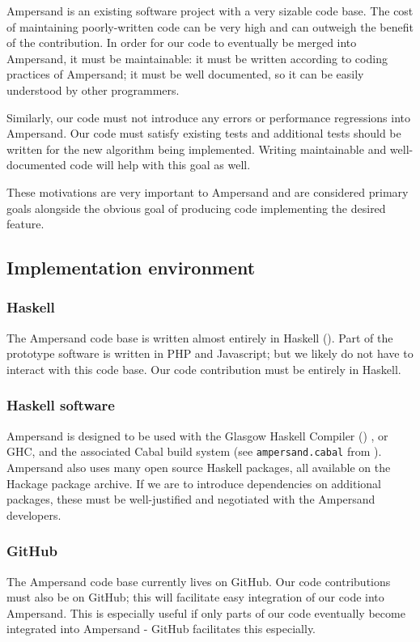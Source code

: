 \documentclass[12pt]{report}
\begin{document}
Ampersand is an existing software project with a very sizable code base. The
cost of maintaining poorly-written code can be very high and can outweigh the
benefit of the contribution. In order for our code to eventually be merged into
Ampersand, it must be maintainable: it must be written according to coding
practices of Ampersand; it must be well documented, so it can be easily
understood by other programmers. 

Similarly, our code must not introduce any errors or performance regressions
into Ampersand. Our code must satisfy existing tests and additional tests should
be written for the new algorithm being implemented. Writing maintainable and
well-documented code will help with this goal as well.

These motivations are very important to Ampersand and are considered primary
goals alongside the obvious goal of producing code implementing the desired
feature.

\subsection{Implementation environment}
\subsubsection*{Haskell}
The Ampersand code base is written almost entirely in Haskell (\cite{ampSource}). Part of the
prototype software is written in PHP and Javascript; 
but we likely do not have to interact with this code base. Our code contribution
must be entirely in Haskell.

\subsubsection*{Haskell software}
Ampersand is designed to be used with the Glasgow Haskell Compiler (\cite{GHC}) , or GHC,
and the associated Cabal build system (see \verb|ampersand.cabal| from \cite{ampSource}). 
Ampersand also uses many open source Haskell packages, all available on the
Hackage package archive. 
If we are to introduce dependencies on additional packages,
  these must be well-justified and negotiated with the Ampersand developers.


\subsubsection*{GitHub}
The Ampersand code base currently lives on GitHub. Our code contributions must
also be on GitHub; this will facilitate easy integration of our code into
Ampersand. This is especially useful if only parts of our code eventually become
integrated into Ampersand - GitHub facilitates this especially. 
%
\end{document}
